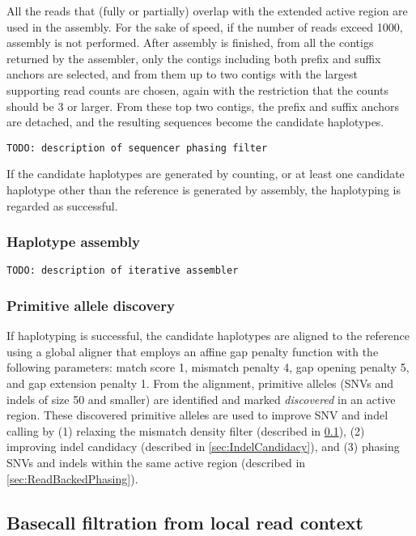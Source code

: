 \documentclass{article}
\begin{document}
All the reads that (fully or partially) overlap with the extended active region are used in the assembly. For the sake of speed, if the number of reads exceed 1000, assembly is not performed. After assembly is finished, from all the contigs returned by the assembler, only the contigs including both prefix and suffix anchors are selected, and from them up to two contigs with the largest supporting read counts are chosen, again with the restriction that the counts should be 3 or larger. From these top two contigs, the prefix and suffix anchors are detached, and the resulting sequences become the candidate haplotypes.

{\tt TODO: description of sequencer phasing filter}

If the candidate haplotypes are generated by counting, or at least one candidate haplotype other than the reference is generated by assembly, the haplotyping is regarded as successful.

\subsubsection{Haplotype assembly}
\label{sec:HaplotypeAssembler}
{\tt TODO: description of iterative assembler}

\subsubsection{Primitive allele discovery}
If haplotyping is successful, the candidate haplotypes are aligned to the reference using a global aligner that employs an affine gap penalty function with the following parameters: match score 1, mismatch penalty 4, gap opening penalty 5, and gap extension penalty 1. From the alignment, primitive alleles (SNVs and indels of size 50 and smaller) are identified and marked {\em discovered} in an active region. These discovered primitive alleles are used to improve SNV and indel calling by (1) relaxing the mismatch density filter (described in \ref{sec:BasecallFiltrationFromContext}), (2) improving indel candidacy (described in \ref{sec:IndelCandidacy}), and (3) phasing SNVs and indels within the same active region (described in \ref{sec:ReadBackedPhasing}).

\subsection{Basecall filtration from local read context}
\label{sec:BasecallFiltrationFromContext}
\end{document}
